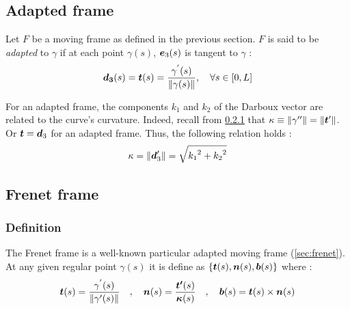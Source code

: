 \subsection{Adapted frame}
Let $F$ be a moving frame as defined in the previous section. $F$ is said to be \emph{adapted} to $\gamma$ if at each point $\gamma(s)$, $\boldsymbol{e}_{3}(s)$ is tangent to $\gamma$ :
\begin{equation}
	\boldsymbol{d_{3}}(s) = \boldsymbol{t}(s) = \frac{\gamma^{'}(s)}{\|\gamma(s)\|}, \quad \forall s \in [0,L]
\end{equation}

For an adapted frame, the components $k_1$ and $k_2$ of the Darboux vector are related to the curve's curvature. Indeed, recall from \ref{} that $\kappa \equiv \|\gamma''\| = \|\boldsymbol{t}'\|$. Or $\boldsymbol{t} = \boldsymbol{d}_3$ for an adapted frame. Thus, the following relation holds :
\begin{equation}
	\kappa = \|\boldsymbol{d}'_3\| = \sqrt{{k_{1}}^2 + {k_{2}}^2}
\end{equation}

\subsection{Frenet frame}

\subsubsection{Definition}
The Frenet frame is a well-known particular adapted moving frame (\autoref{sec:frenet}). At any given regular point $\gamma(s)$ it is define as $\{\boldsymbol{t}(s),\boldsymbol{n}(s),\boldsymbol{b}(s)\}$ where :
\begin{gather}
\boldsymbol{t}(s) = \frac{\gamma^{'}(s)}{\|\gamma'(s)\|}
\quad,\quad
\boldsymbol{n}(s) = \frac{\boldsymbol{t'}(s)}{\boldsymbol{\kappa}(s)}
\quad,\quad
\boldsymbol{b}(s)= \boldsymbol{t}(s)\times\boldsymbol{n}(s)
\end{gather}

